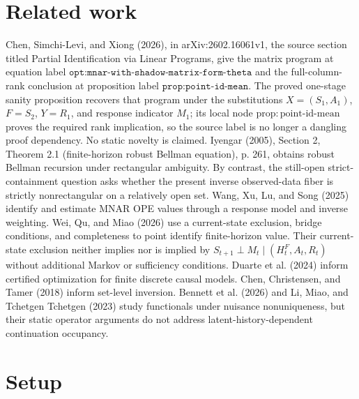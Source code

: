 \documentclass{article}
\begin{document}
\section{Related work}

Chen, Simchi-Levi, and Xiong (2026), in arXiv:2602.16061v1, the source section titled Partial Identification via Linear Programs, give the matrix program at equation label \(\texttt{opt:mnar-with-shadow-matrix-form-theta}\) and the full-column-rank conclusion at proposition label \(\texttt{prop:point-id-mean}\). The proved one-stage sanity proposition recovers that program under the substitutions \(X=(S_1,A_1)\), \(F=S_2\), \(Y=R_1\), and response indicator \(M_1\); its local node \(\mathrm{prop{:}point\text{-}id\text{-}mean}\) proves the required rank implication, so the source label is no longer a dangling proof dependency. No static novelty is claimed. Iyengar (2005), Section 2, Theorem 2.1 (finite-horizon robust Bellman equation), p. 261, obtains robust Bellman recursion under rectangular ambiguity. By contrast, the still-open strict-containment question asks whether the present inverse observed-data fiber is strictly nonrectangular on a relatively open set. Wang, Xu, Lu, and Song (2025) identify and estimate MNAR OPE values through a response model and inverse weighting. Wei, Qu, and Miao (2026) use a current-state exclusion, bridge conditions, and completeness to point identify finite-horizon value. Their current-state exclusion neither implies nor is implied by \(S_{t+1}\perp M_t\mid(H_t^F,A_t,R_t)\) without additional Markov or sufficiency conditions. Duarte et al. (2024) inform certified optimization for finite discrete causal models. Chen, Christensen, and Tamer (2018) inform set-level inversion. Bennett et al. (2026) and Li, Miao, and Tchetgen Tchetgen (2023) study functionals under nuisance nonuniqueness, but their static operator arguments do not address latent-history-dependent continuation occupancy.

\section{Setup}
\end{document}
